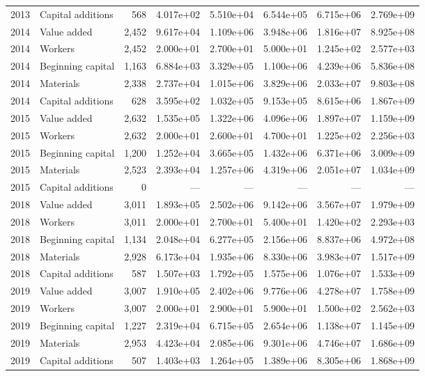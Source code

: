 \begin{longtable}{llrrrrrr}
2013 & Capital additions & 568 & 4.017e+02 & 5.510e+04 & 6.544e+05 & 6.715e+06 & 2.769e+09 \\
2014 & Value added & 2,452 & 9.617e+04 & 1.109e+06 & 3.948e+06 & 1.816e+07 & 8.925e+08 \\
2014 & Workers & 2,452 & 2.000e+01 & 2.700e+01 & 5.000e+01 & 1.245e+02 & 2.577e+03 \\
2014 & Beginning capital & 1,163 & 6.884e+03 & 3.329e+05 & 1.100e+06 & 4.239e+06 & 5.836e+08 \\
2014 & Materials & 2,338 & 2.737e+04 & 1.015e+06 & 3.829e+06 & 2.033e+07 & 9.803e+08 \\
2014 & Capital additions & 628 & 3.595e+02 & 1.032e+05 & 9.153e+05 & 8.615e+06 & 1.867e+09 \\
2015 & Value added & 2,632 & 1.535e+05 & 1.322e+06 & 4.096e+06 & 1.897e+07 & 1.159e+09 \\
2015 & Workers & 2,632 & 2.000e+01 & 2.600e+01 & 4.700e+01 & 1.225e+02 & 2.256e+03 \\
2015 & Beginning capital & 1,200 & 1.252e+04 & 3.665e+05 & 1.432e+06 & 6.371e+06 & 3.009e+09 \\
2015 & Materials & 2,523 & 2.393e+04 & 1.257e+06 & 4.319e+06 & 2.051e+07 & 1.034e+09 \\
2015 & Capital additions & 0 & --- & --- & --- & --- & --- \\
2018 & Value added & 3,011 & 1.893e+05 & 2.502e+06 & 9.142e+06 & 3.567e+07 & 1.979e+09 \\
2018 & Workers & 3,011 & 2.000e+01 & 2.700e+01 & 5.400e+01 & 1.420e+02 & 2.293e+03 \\
2018 & Beginning capital & 1,134 & 2.048e+04 & 6.277e+05 & 2.156e+06 & 8.837e+06 & 4.972e+08 \\
2018 & Materials & 2,928 & 6.173e+04 & 1.935e+06 & 8.330e+06 & 3.983e+07 & 1.517e+09 \\
2018 & Capital additions & 587 & 1.507e+03 & 1.792e+05 & 1.575e+06 & 1.076e+07 & 1.533e+09 \\
2019 & Value added & 3,007 & 1.910e+05 & 2.402e+06 & 9.776e+06 & 4.278e+07 & 1.758e+09 \\
2019 & Workers & 3,007 & 2.000e+01 & 2.900e+01 & 5.900e+01 & 1.500e+02 & 2.562e+03 \\
2019 & Beginning capital & 1,227 & 2.319e+04 & 6.715e+05 & 2.654e+06 & 1.138e+07 & 1.145e+09 \\
2019 & Materials & 2,953 & 4.423e+04 & 2.085e+06 & 9.301e+06 & 4.746e+07 & 1.686e+09 \\
2019 & Capital additions & 507 & 1.403e+03 & 1.264e+05 & 1.389e+06 & 8.305e+06 & 1.868e+09 \\

\end{longtable}
